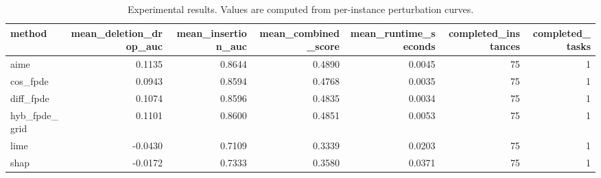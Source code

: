 \begin{table}[t]
\caption{Experimental results. Values are computed from per-instance perturbation curves.}
\label{tab:main_results_computed}
\centering
\begin{tabular}{lrrrrrr}
\toprule
method & mean\_deletion\_drop\_auc & mean\_insertion\_auc & mean\_combined\_score & mean\_runtime\_seconds & completed\_instances & completed\_tasks \\
\midrule
aime & 0.1135 & 0.8644 & 0.4890 & 0.0045 & 75 & 1 \\
cos\_fpde & 0.0943 & 0.8594 & 0.4768 & 0.0035 & 75 & 1 \\
diff\_fpde & 0.1074 & 0.8596 & 0.4835 & 0.0034 & 75 & 1 \\
hyb\_fpde\_grid & 0.1101 & 0.8600 & 0.4851 & 0.0053 & 75 & 1 \\
lime & -0.0430 & 0.7109 & 0.3339 & 0.0203 & 75 & 1 \\
shap & -0.0172 & 0.7333 & 0.3580 & 0.0371 & 75 & 1 \\
\bottomrule
\end{tabular}

\end{table}
